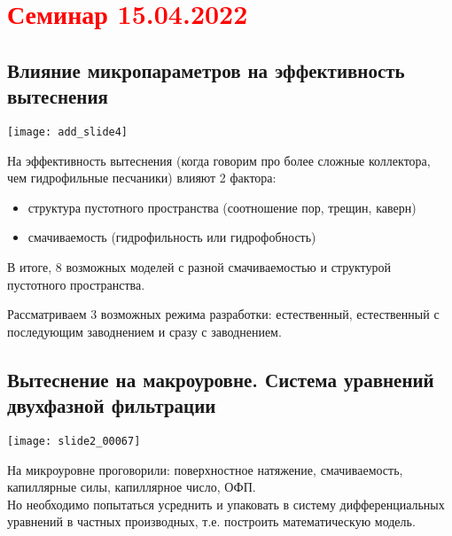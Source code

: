 \documentclass[main.tex]{subfiles}
\begin{document}
\section{\textcolor{red}{Семинар 15.04.2022}}

\subsection{Влияние микропараметров на эффективность вытеснения}

\texttt{[image: add\_slide4]}








На эффективность вытеснения (когда говорим про более сложные коллектора, чем гидрофильные песчаники) влияют 2 фактора:
\begin{itemize}
	\item структура пустотного пространства (соотношение пор, трещин, каверн)
	\item смачиваемость (гидрофильность или гидрофобность)
\end{itemize}
В итоге, 8 возможных моделей с разной смачиваемостью и структурой пустотного пространства.


Рассматриваем 3 возможных режима разработки: естественный, естественный с последующим заводнением и сразу с заводнением.


\subsection{Вытеснение на макроуровне. Система уравнений двухфазной фильтрации}

\texttt{[image: slide2\_00067]}

На микроуровне проговорили: поверхностное натяжение, смачиваемость, капиллярные силы, капиллярное число, ОФП.\\

Но необходимо попытаться усреднить и упаковать в систему дифференциальных уравнений в частных производных, т.е. построить математическую модель.
\end{document}
